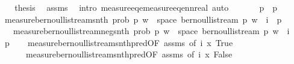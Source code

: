 \begin{isabellebody}
\ \ \isamarkupfalse%
\ \isamarkupfalse%
\ {\isacharquery}{\kern0pt}thesis\ \isamarkupfalse%
\ assms\ \isamarkupfalse%
\ {\isacharparenleft}{\kern0pt}intro\ measure{\isacharunderscore}{\kern0pt}eq{\isacharunderscore}{\kern0pt}emeasure{\isacharunderscore}{\kern0pt}eq{\isacharunderscore}{\kern0pt}ennreal{\isacharparenright}{\kern0pt}\ auto\isanewline
{}\isamarkupfalse%
%
\endisatagproof
{\isafoldproof}%
%
\isadelimproof
\isanewline
%
\endisadelimproof
\isanewline
{}\isamarkupfalse%
\ \isanewline
\ \ \ {\isachardoublequoteopen}{}\ {\isasymle}\ p{\isachardoublequoteclose}\ \ {\isachardoublequoteopen}p\ {\isasymle}\ {}{\isachardoublequoteclose}\isanewline
\ \ \ measure{\isacharunderscore}{\kern0pt}bernoulli{\isacharunderscore}{\kern0pt}stream{\isacharunderscore}{\kern0pt}snth{\isacharcolon}{\kern0pt}\ {\isachardoublequoteopen}prob\ p\ {\isacharbraceleft}{\kern0pt}w\ {\isasymin}\ space\ {\isacharparenleft}{\kern0pt}bernoulli{\isacharunderscore}{\kern0pt}stream\ p{\isacharparenright}{\kern0pt}{\isachardot}{\kern0pt}\ w\ {\isacharbang}{\kern0pt}{\isacharbang}{\kern0pt}\ i{\isacharbraceright}{\kern0pt}\ {\isacharequal}{\kern0pt}\ p{\isachardoublequoteclose}\isanewline
\ \ \ \ \ measure{\isacharunderscore}{\kern0pt}bernoulli{\isacharunderscore}{\kern0pt}stream{\isacharunderscore}{\kern0pt}neg{\isacharunderscore}{\kern0pt}snth{\isacharcolon}{\kern0pt}\ {\isachardoublequoteopen}prob\ p\ {\isacharbraceleft}{\kern0pt}w\ {\isasymin}\ space\ {\isacharparenleft}{\kern0pt}bernoulli{\isacharunderscore}{\kern0pt}stream\ p{\isacharparenright}{\kern0pt}{\isachardot}{\kern0pt}\ {\isasymnot}w\ {\isacharbang}{\kern0pt}{\isacharbang}{\kern0pt}\ i{\isacharbraceright}{\kern0pt}\ {\isacharequal}{\kern0pt}\ {}\ {\isacharminus}{\kern0pt}\ p{\isachardoublequoteclose}\isanewline
%
\isadelimproof
\ \ %
\endisadelimproof
%
\isatagproof
{}\isamarkupfalse%
\ measure{\isacharunderscore}{\kern0pt}bernoulli{\isacharunderscore}{\kern0pt}stream{\isacharunderscore}{\kern0pt}snth{\isacharunderscore}{\kern0pt}pred{\isacharbrackleft}{\kern0pt}OF\ assms{\isacharcomma}{\kern0pt}\ of\ {\isachardoublequoteopen}{\isacharbraceleft}{\kern0pt}i{\isacharbraceright}{\kern0pt}{\isachardoublequoteclose}\ {\isachardoublequoteopen}{\isasymlambda}x{\isachardot}{\kern0pt}\ True{\isachardoublequoteclose}{\isacharbrackright}{\kern0pt}\isanewline
\ \ \ \ \ \ \ \ measure{\isacharunderscore}{\kern0pt}bernoulli{\isacharunderscore}{\kern0pt}stream{\isacharunderscore}{\kern0pt}snth{\isacharunderscore}{\kern0pt}pred{\isacharbrackleft}{\kern0pt}OF\ assms{\isacharcomma}{\kern0pt}\ of\ {\isachardoublequoteopen}{\isacharbraceleft}{\kern0pt}i{\isacharbraceright}{\kern0pt}{\isachardoublequoteclose}\ {\isachardoublequoteopen}{\isasymlambda}x{\isachardot}{\kern0pt}\ False{\isachardoublequoteclose}{\isacharbrackright}{\kern0pt}\ \isamarkupfalse%

\end{isabellebody}
